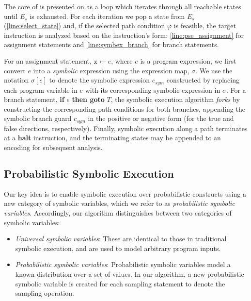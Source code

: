 \documentclass[acmsmall,review,anonymous]{acmart}\settopmatter{printfolios=true,printccs=false,printacmref=false}
\begin{document}
The core of  is presented on  as a loop which iterates through all reachable states until $E_s$ is exhausted.
% 
For each iteration we pop a state from $E_s$ (\cref{line:select_state}) and, if the selected path condition $\varphi$ is feasible, the target instruction is analyzed based on the instruction's form: \cref{line:pse_assignment} for assignment statements and \cref{line:symbex_branch} for branch statements.


For an assignment statement, $\mathtt{x} \leftarrow e$, where $e$ is a program expression, we first convert $e$ into a \textit{symbolic} expression using the expression map, $\sigma$. %
% 
We use the notation $\sigma[e]$ to denote the symbolic expression $e_{sym}$ constructed by replacing each program variable in $e$ with its corresponding symbolic expression in $\sigma$.
% 
% 
For a branch statement, \textbf{if} $e$ \textbf{then goto} $T$, the symbolic execution algorithm \textit{forks} by constructing the corresponding path conditions for both branches, appending the symbolic branch guard $c_{sym}$ in the positive or negative form (for the true and false directions, respectively).
% 
Finally, symbolic execution along a path terminates at a \textbf{halt} instruction, and the terminating states may be appended to an encoding for subsequent analysis.

\subsection{Probabilistic Symbolic Execution}
\label{sec:pse_intro}

Our key idea is to enable symbolic execution over probabilistic constructs using a new category of symbolic variables, which we refer to as \textit{probabilistic symbolic variables}.
% 
Accordingly, our algorithm distinguishes between two categories of symbolic variables:

\begin{itemize}
\item \textit{Universal symbolic variables}: These are identical to those in traditional symbolic execution, and are used to model arbitrary program inputs.
\item \textit{Probabilistic symbolic variables}: Probabilistic symbolic variables model a known distribution over a set of values.
  In our algorithm, a new probabilistic symbolic variable is created for each sampling statement to denote the sampling operation.
\end{itemize}
\end{document}
